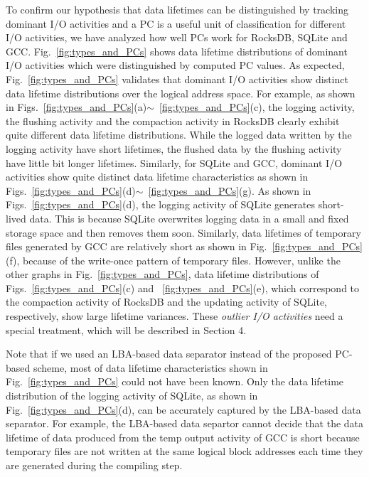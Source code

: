 To confirm our hypothesis that data lifetimes can be distinguished by tracking
dominant I/O activities and a PC is a useful unit of classification for 
different I/O activities,
we have analyzed how well PCs work for RocksDB, SQLite and GCC.
Fig.~\ref{fig:types_and_PCs} shows data lifetime distributions of 
dominant I/O activities which were distinguished by computed PC values.
As expected, Fig.~\ref{fig:types_and_PCs} validates that dominant I/O activities 
show distinct data lifetime distributions over the logical address space.
For example, as shown in Figs.~\ref{fig:types_and_PCs}(a)$\sim$~\ref{fig:types_and_PCs}(c), 
the logging activity, the flushing activity and the compaction activity 
in RocksDB clearly exhibit quite different data lifetime distributions.
While the logged data written by the logging activity have short lifetimes, 
the flushed data by the flushing activity have little bit longer lifetimes.  
Similarly, for SQLite and GCC, dominant I/O
activities show quite distinct data lifetime characteristics as shown in 
Figs.~\ref{fig:types_and_PCs}(d)$\sim$~\ref{fig:types_and_PCs}(g).
As shown in Figs.~\ref{fig:types_and_PCs}(d), the logging activity of
SQLite generates short-lived data.  This is because SQLite overwrites logging
data in a small and fixed storage space and then removes them soon. 
Similarly,
data lifetimes of temporary files generated by GCC are 
relatively short as shown in Fig.~\ref{fig:types_and_PCs}(f),
because of the write-once pattern of temporary files.
{\color{blue}
However, unlike the other graphs in Fig.~\ref{fig:types_and_PCs}, data lifetime
distributions of Figs.~\ref{fig:types_and_PCs}(c) and ~\ref{fig:types_and_PCs}(e),
which correspond to the compaction activity of RocksDB and the updating activity of
SQLite, respectively, show large lifetime variances.
These {\it outlier I/O activities} need a special treatment, which 
will be described in Section 4.
}

Note that if we used an LBA-based data separator instead of the proposed PC-based scheme, 
most of data lifetime characteristics shown in Fig.~\ref{fig:types_and_PCs} could 
not have been known.  Only the data lifetime
distribution of the logging activity of SQLite, as shown in Fig.~\ref{fig:types_and_PCs}(d), 
can be accurately captured by the LBA-based data separator.  
For example, the LBA-based data separtor cannot 
decide that the data lifetime of data produced from the temp output activity of GCC 
is short because temporary files are not written at the same logical block addresses 
each time they are generated during
the compiling step. 


